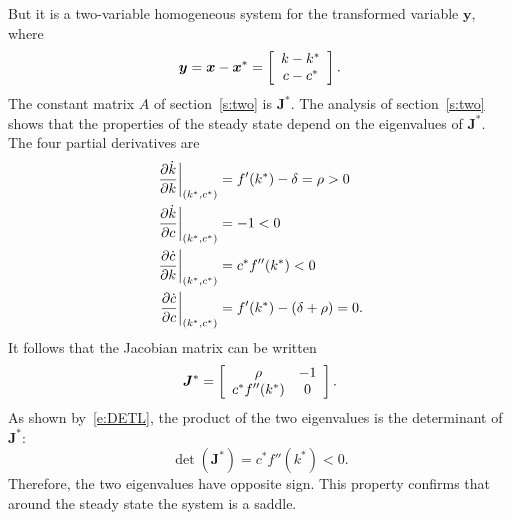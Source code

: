 \documentclass[letterpaper, 11pt, leqno]{article}
\begin{document}
But it is a two-variable homogeneous system for the transformed variable $\bm{y}$, where
\begin{equation*}
\bm{y}=\bm{x}-\bm{x}^{*}=\left[ 
\begin{array}{c}
k-k^{*}\\ 
c-c^{*}
\end{array} \right].
\end{equation*}
The constant matrix $A$ of section~\ref{s:two} is $\bm{J}^{*}$. The analysis of section~\ref{s:two} shows that the properties of the steady state depend on the eigenvalues of $\bm{J}^{*}$. The four partial derivatives are
\begin{align*}
\pd{\dot{k}}{k}{(k^{*},c^{*})}&=f'(k^{*}) -\d =\r >0 \\
\pd{\dot{k}}{c}{(k^{*},c^{*})}&=-1<0 \\
\pd{\dot{c}}{k}{(k^{*},c^{*})}&=c^{*} f''(k^{*}) <0 \\
\pd{\dot{c}}{c}{(k^{*},c^{*})}&=f'(k^{*}) - (\d +\r) =0.
\end{align*}
It follows that the Jacobian matrix can be written 
\begin{equation*}
\bm{J}^{*}=\left[ 
\begin{array}{cc}
\rho & -1 \\ 
c^{*} f''(k^{*}) & 0
\end{array} \right].
\end{equation*}
As shown by~\eqref{e:DETL}, the product of the two eigenvalues is the determinant of $\bm{J}^{*}$: 
\begin{equation*}
\det(\bm{J}^{*})=c^{*} f''(k^{*}) <0.
\end{equation*} Therefore, the two eigenvalues have opposite sign. This property confirms that around the steady state the system is a saddle.
\end{document}
